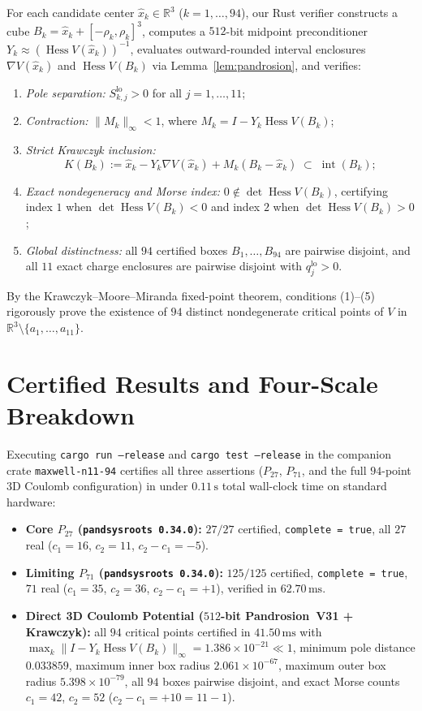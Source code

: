\documentclass[11pt,a4paper]{amsart}
\theoremstyle{definition}
\newcommand{\R}{\mathbb{R}}
\DeclareMathOperator{\Hess}{Hess}
\begin{document}
For each candidate center $\hat{x}_k \in \R^3$ ($k = 1,\dots,94$), our Rust
verifier constructs a cube $B_k = \hat{x}_k + [-\rho_k, \rho_k]^3$, computes a
$512$-bit midpoint preconditioner $Y_k \approx (\Hess V(\hat{x}_k))^{-1}$,
evaluates outward-rounded interval enclosures $\nabla V(\hat{x}_k)$ and
$\Hess V(B_k)$ via Lemma~\ref{lem:pandrosion}, and verifies:
\begin{enumerate}
  \item \emph{Pole separation:} $S_{k,j}^{\mathrm{lo}} > 0$ for all $j = 1,\dots,11$;
  \item \emph{Contraction:} $\|M_k\|_\infty < 1$, where $M_k = I - Y_k \Hess V(B_k)$;
  \item \emph{Strict Krawczyk inclusion:}
  \[
    K(B_k) := \hat{x}_k - Y_k \nabla V(\hat{x}_k) + M_k(B_k - \hat{x}_k)
    \;\subset\; \operatorname{int}(B_k);
  \]
  \item \emph{Exact nondegeneracy and Morse index:} $0 \notin \det \Hess V(B_k)$,
  certifying index $1$ when $\det \Hess V(B_k) < 0$ and index $2$ when
  $\det \Hess V(B_k) > 0$;
  \item \emph{Global distinctness:} all $94$ certified boxes $B_1,\dots,B_{94}$
  are pairwise disjoint, and all $11$ exact charge enclosures are pairwise
  disjoint with $q_j^{\mathrm{lo}} > 0$.
\end{enumerate}

By the Krawczyk--Moore--Miranda fixed-point theorem, conditions (1)--(5)
rigorously prove the existence of $94$ distinct nondegenerate critical points
of $V$ in $\R^3 \setminus \{a_1,\dots,a_{11}\}$.

\section{Certified Results and Four-Scale Breakdown}\label{sec:results}

Executing \texttt{cargo run --release} and \texttt{cargo test --release} in the
companion crate \texttt{maxwell-n11-94} certifies all three assertions
($P_{27}$, $P_{71}$, and the full $94$-point 3D Coulomb configuration) in under
$0.11\,\mathrm{s}$ total wall-clock time on standard hardware:
\begin{itemize}
  \item \textbf{Core $P_{27}$ (\texttt{pandsysroots~0.34.0}):} $27/27$ certified,
  \texttt{complete = true}, all $27$ real ($c_1 = 16$, $c_2 = 11$, $c_2 - c_1 = -5$).
  \item \textbf{Limiting $P_{71}$ (\texttt{pandsysroots~0.34.0}):} $125/125$
  certified, \texttt{complete = true}, $71$ real ($c_1 = 35$, $c_2 = 36$,
  $c_2 - c_1 = +1$), verified in $62.70\,\mathrm{ms}$.
  \item \textbf{Direct 3D Coulomb Potential ($512$-bit Pandrosion~V31 + Krawczyk):}
  all $94$ critical points certified in $41.50\,\mathrm{ms}$ with
  $\max_k \|I - Y_k \Hess V(B_k)\|_\infty = 1.386 \times 10^{-21} \ll 1$,
  minimum pole distance $0.033859$, maximum inner box radius
  $2.061 \times 10^{-67}$, maximum outer box radius $5.398 \times 10^{-79}$,
  all $94$ boxes pairwise disjoint, and exact Morse counts $c_1 = 42$,
  $c_2 = 52$ ($c_2 - c_1 = +10 = 11 - 1$).
\end{itemize}
\end{document}
